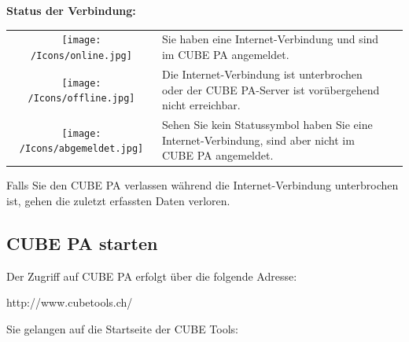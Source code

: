 \vspace{\baselineskip}

\textbf{Status der Verbindung:}

\vspace{\baselineskip}

\begin{tabular}{c | p{14cm} l} %

\vspace{+1pt}	
\texttt{[image: /Icons/online.jpg]} & Sie haben eine Internet-Verbindung und sind im CUBE PA angemeldet. \\
\vspace{+1pt}	
\texttt{[image: /Icons/offline.jpg]} & Die Internet-Verbindung ist unterbrochen oder der CUBE PA-Server ist vorübergehend nicht erreichbar. \\
\vspace{+1pt}	
\texttt{[image: /Icons/abgemeldet.jpg]} & Sehen Sie kein Statussymbol haben Sie eine Internet-Verbindung, sind aber nicht im CUBE PA angemeldet. \\


\end{tabular}

\vspace{\baselineskip}

Falls Sie den CUBE PA verlassen während die Internet-Verbindung unterbrochen ist, gehen die zuletzt erfassten Daten verloren.

\subsection{CUBE PA starten}


Der Zugriff auf CUBE PA erfolgt über die folgende Adresse:

\vspace{\baselineskip}

{\color{red} http://www.cubetools.ch/}

\vspace{\baselineskip}

Sie gelangen auf die Startseite der CUBE Tools:

